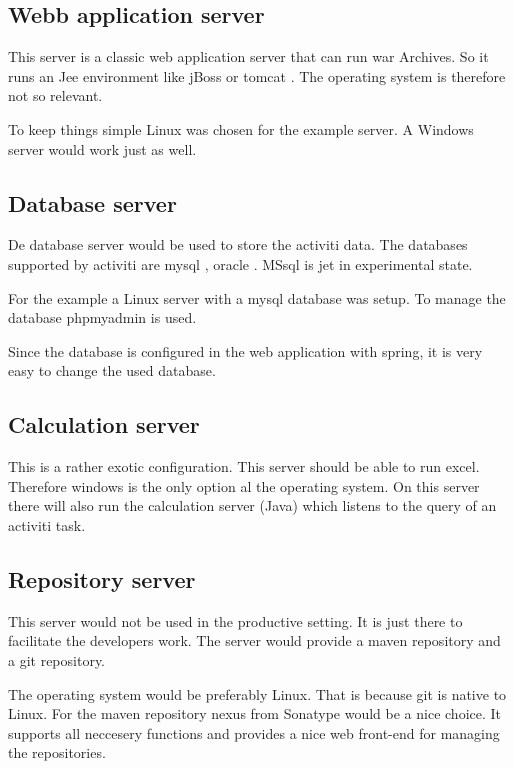 \documentclass[paper=a4,twoside=false,BCOR=0mm,DIV=calc,fontsize=12pt]{scrartcl}
\begin{document}
\subsection{Webb application server}
This server is a classic web application server that can run war Archives. 
So it runs an Jee environment like jBoss \cite{jboss} or tomcat \cite{tomcat}.
The operating system is therefore not so relevant. 

To keep things simple Linux was chosen for the example server. A Windows server would work just as well.



\subsection{Database server}
De database server would be used to store the activiti data. The databases supported by activiti are mysql \cite{mysql}, oracle \cite{oracledb}. MSsql \cite{mssql} is jet in experimental state.
 
For the example a Linux server with a mysql database was setup.
To manage the database phpmyadmin \cite{phpmyadmin} is used.

Since the database is configured in the web application with spring, it is very easy to change the used database.


\subsection{Calculation server}
This is a rather exotic configuration. This server should be able to run excel. Therefore windows is the only option al the operating system. On this server there will also run the calculation server (Java) which listens to the query of an activiti task.



\subsection{Repository server}
This server would not be used in the productive setting. It is just there to facilitate the developers work.
The server would provide a maven repository and a git repository. 

The operating system would be preferably Linux. That is because git is native to Linux.
For the maven repository nexus from Sonatype would be a nice choice. It supports all neccesery functions and provides a nice web front-end for managing the repositories.
\end{document}
